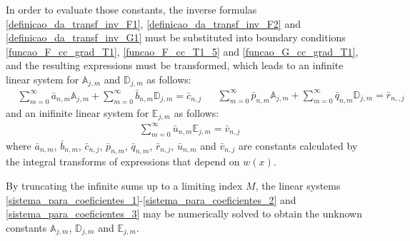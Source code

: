 \documentclass[conference,compsoc,fleqn]{IEEEtran}
\begin{document}
In order to evaluate those constants, the inverse formulas \eqref{definicao_da_transf_inv_F1}, \eqref{definicao_da_transf_inv_F2} and \eqref{definicao_da_transf_inv_G1} must be substituted into boundary conditions \eqref{funcao_F_cc_grad_T1}, \eqref{funcao_F_cc_T1_5} and \eqref{funcao_G_cc_grad_T1}, and the resulting expressions must be transformed, which leads to an infinite linear system for $\mathbb{A}_{j,m}$ and $\mathbb{D}_{j,m}$ as follows:
\begin{subequations}
\begin{align}
& \sum_{m = 0}^\infty \bar{a}_{n,m} \mathbb{A}_{j,m} + \sum_{m = 0}^\infty \bar{b}_{n,m} \mathbb{D}_{j,m} = \bar{c}_{n,j} \label{sistema_para_coeficientes_1}
\end{align}
\begin{align}
& \sum_{m = 0}^\infty \bar{p}_{n,m} \mathbb{A}_{j,m} + \sum_{m = 0}^\infty \bar{q}_{n,m} \mathbb{D}_{j,m} = \bar{r}_{n,,j} \label{sistema_para_coeficientes_2}
\end{align}
\end{subequations}
and an inifinite linear system for $\mathbb{E}_{j,m}$ as follows:
\begin{align}
& \sum_{m = 0}^\infty \bar{u}_{n,m} \mathbb{E}_{j,m} = \bar{v}_{n,j} \label{sistema_para_coeficientes_3}
\end{align}
where $\bar{a}_{n,m}$, $\bar{b}_{n,m}$, $\bar{c}_{n,j}$, $\bar{p}_{n,m}$, $\bar{q}_{n,m}$, $\bar{r}_{n,j}$, $\bar{u}_{n,m}$ and $\bar{v}_{n,j}$ are constants calculated by the integral transforms of expressions that depend on $w(x)$.

By truncating the infinite sums up to a limiting index $M$, the linear systems \eqref{sistema_para_coeficientes_1}-\eqref{sistema_para_coeficientes_2} and \eqref{sistema_para_coeficientes_3} may be numerically solved to obtain the unknown constants $\mathbb{A}_{j,m}$, $\mathbb{D}_{j,m}$ and $\mathbb{E}_{j,m}$.
\end{document}
